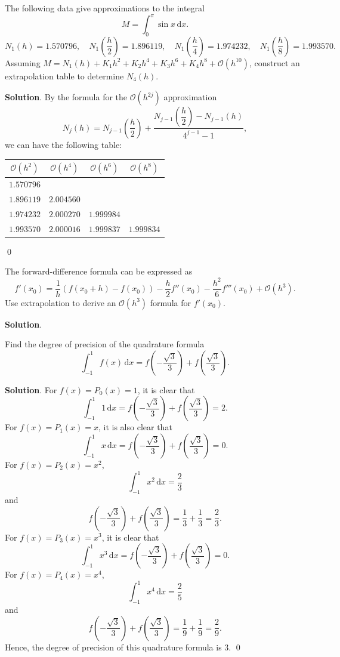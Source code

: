 \documentclass[11pt]{article}
\theoremstyle{break}
\newcommand{\ddi}{\text{$\,$d}}
\numberwithin{equation}{theorem}
\begin{document}
\newpage
\begin{problem}\label{problem 4} %
    The following data give approximations to the integral $$M=\int_0^\pi\sin x\ddi x.$$
    $$N_1(h)=1.570796, \quad N_1\left(\dfrac{h}{2}\right)=1.896119, \quad N_1\left(\dfrac{h}{4}\right)=1.974232, \quad N_1\left(\dfrac{h}{8}\right)=1.993570.$$
    Assuming $M=N_1(h)+K_1h^2+K_2h^4+K_3h^6+K_4h^8+\mathcal{O}(h^{10})$, construct an extrapolation table to determine $N_4(h)$.
\end{problem}
\textbf{Solution}. By the formula for the $\mathcal{O}(h^{2j})$ approximation $$N_j(h)=N_{j-1}\left(\dfrac{h}{2}\right)+\dfrac{N_{j-1}\left(\dfrac{h}{2}\right)-N_{j-1}(h)}{4^{j-1}-1},$$ we can have the following table:
\begin{center}
    \begin{tabular}{c|c|c|c}
        $\mathcal{O}(h^2)$ & $\mathcal{O}(h^4)$ & $\mathcal{O}(h^6)$ & $\mathcal{O}(h^8)$\\
        \hline
        $1.570796$ &&& \\
        \hline
        $1.896119$ & $2.004560$ && \\
        \hline
        $1.974232$ & $2.000270$ & $1.999984$ & \\
        \hline
        $1.993570$ & $2.000016$ & $1.999837$ & $1.999834$
    \end{tabular}
\end{center}
\qed


\newpage
\begin{problem}\label{problem 5} %
    The forward-difference formula can be expressed as $$f'(x_0)=\dfrac{1}{h}\left(f(x_0+h)-f(x_0)\right)-\dfrac{h}{2}f''(x_0)-\dfrac{h^2}{6}f'''(x_0)+\mathcal{O}(h^3).$$ Use extrapolation to derive an $\mathcal{O}(h^3)$ formula for $f'(x_0)$.
\end{problem}
\textbf{Solution}. 


\newpage
\begin{problem}\label{problem 6} %
    Find the degree of precision of the quadrature formula $$\int_{-1}^{1}f(x)\ddi x=f\left(-\dfrac{\sqrt{3}}{3}\right)+f\left(\dfrac{\sqrt{3}}{3}\right).$$
\end{problem}
\textbf{Solution}. For $f(x)=P_0(x)=1$, it is clear that $$\int_{-1}^{1}1\ddi x=f\left(-\dfrac{\sqrt{3}}{3}\right)+f\left(\dfrac{\sqrt{3}}{3}\right)=2.$$ For $f(x)=P_1(x)=x$, it is also clear that $$\int_{-1}^{1}x\ddi x=f\left(-\dfrac{\sqrt{3}}{3}\right)+f\left(\dfrac{\sqrt{3}}{3}\right)=0.$$ For $f(x)=P_2(x)=x^2$, $$\int_{-1}^{1}x^2\ddi x=\dfrac{2}{3}$$ and $$f\left(-\dfrac{\sqrt{3}}{3}\right)+f\left(\dfrac{\sqrt{3}}{3}\right)=\dfrac{1}{3}+\dfrac{1}{3}=\dfrac{2}{3}.$$ For $f(x)=P_3(x)=x^3$, it is clear that $$\int_{-1}^{1}x^3\ddi x=f\left(-\dfrac{\sqrt{3}}{3}\right)+f\left(\dfrac{\sqrt{3}}{3}\right)=0.$$ For $f(x)=P_4(x)=x^4$, $$\int_{-1}^{1}x^4\ddi x=\dfrac{2}{5}$$ and $$f\left(-\dfrac{\sqrt{3}}{3}\right)+f\left(\dfrac{\sqrt{3}}{3}\right)=\dfrac{1}{9}+\dfrac{1}{9}=\dfrac{2}{9}.$$ Hence, the degree of precision of this quadrature formula is $3$. \qed
\end{document}
